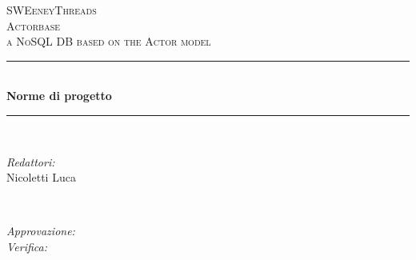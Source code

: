 \documentclass[a4paper]{article}
\begin{document}
	\begin{titlepage}
		\newcommand{\HRule}{\rule{\linewidth}{0.5mm}}
		\center

		\textsc{\LARGE SWEeneyThreads}\\[1.5cm]
		\textsc{\Large Actorbase}\\[0.5cm]
		\textsc{\large a NoSQL DB based on the Actor model}\\[0.5cm]


		\HRule \\[0.4cm]
		{ \huge \bfseries Norme di progetto}\\[0.4cm]
		\HRule \\[1.5cm]

		\begin{minipage}{0.4\textwidth}
			\begin{flushleft} \large
				\emph{Redattori:}\\
				Nicoletti Luca \\
			\end{flushleft}
		\end{minipage}
		~
		\begin{minipage}{0.4\textwidth}
			\begin{flushright} \large
				\emph{Approvazione:} \\
				\emph{Verifica:} \\
			\end{flushright}
		\end{minipage}


\end{titlepage}
\end{document}
